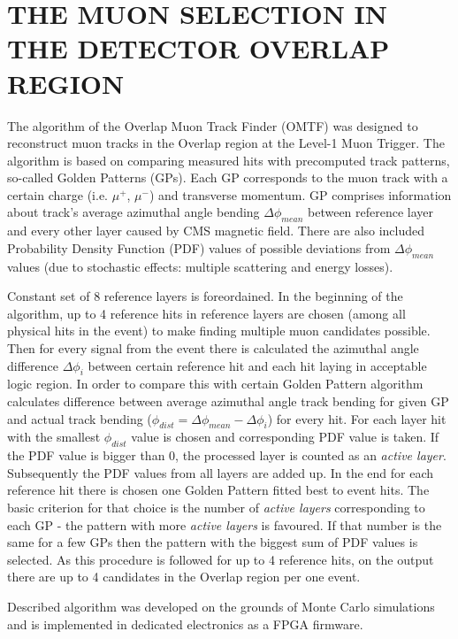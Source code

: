 \section{THE MUON SELECTION IN THE DETECTOR OVERLAP REGION}

The algorithm of the Overlap Muon Track Finder (OMTF) was designed to reconstruct muon tracks in the Overlap region at the Level-1 Muon Trigger. The algorithm is based on comparing measured hits with precomputed track patterns, so-called Golden Patterns (GPs). Each GP corresponds to the muon track with a certain charge (i.e. $\mu^{+}$, $\mu^{-}$) and transverse momentum. GP comprises information about track's average azimuthal angle bending $\Delta \phi_{mean}$ between reference layer and every other layer caused by CMS magnetic field. There are also included Probability Density Function (PDF) values of possible deviations from $\Delta \phi_{mean}$ values (due to stochastic effects: multiple scattering and energy losses). 

Constant set of 8 reference layers is foreordained. In the beginning of the algorithm, up to 4 reference hits in reference layers are chosen (among all physical hits in the event) to make finding multiple muon candidates possible. Then for every signal from the event there is calculated the azimuthal angle difference $\Delta \phi_{i}$ between certain reference hit and each hit laying in acceptable logic region. In order to compare this with certain Golden Pattern algorithm calculates difference between average azimuthal angle track bending for given GP and actual track bending ($\phi_{dist} = \Delta\phi_{mean} - \Delta\phi_{i}$)%
 for every hit. For each layer hit with the smallest $\phi_{dist}$ value is chosen and corresponding PDF value is taken. If the PDF value is bigger than 0, the processed layer is counted as an \textit{active layer}. Subsequently the PDF values from all layers are added up. In the end for each reference hit there is chosen one Golden Pattern fitted best to event hits. The basic criterion for that choice is the number of \textit{active layers} corresponding to each GP - the pattern with more \textit{active layers} is favoured. If that number is the same for a few GPs then the pattern with the biggest sum of PDF values is selected. As this procedure is followed for up to 4 reference hits, on the output there are up to 4 candidates in the Overlap region per one event.

Described algorithm was developed on the grounds of Monte Carlo simulations and is implemented in dedicated electronics as a FPGA firmware.
%
\cite{OMTF-Wilga2014}
